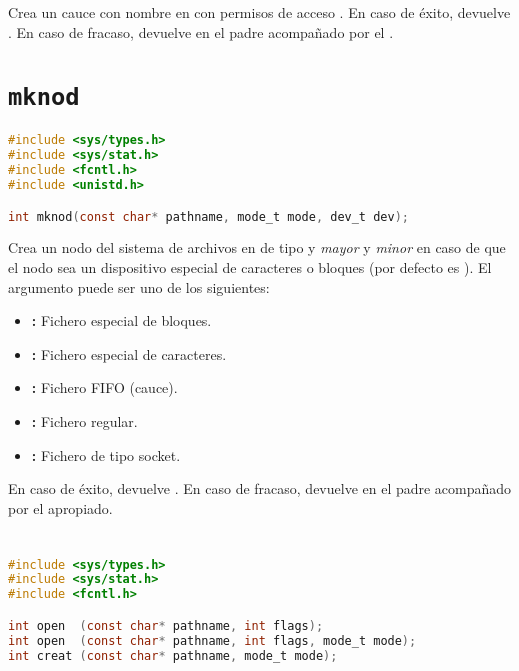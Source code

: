 Crea un cauce con nombre en  con permisos de acceso .
En caso de éxito, devuelve .
En caso de fracaso, devuelve  en el padre acompañado por el .

\section{\texttt{mknod}}\label{mknod}

\begin{lstlisting}[language=C]
#include <sys/types.h>
#include <sys/stat.h>
#include <fcntl.h>
#include <unistd.h>

int mknod(const char* pathname, mode_t mode, dev_t dev);
\end{lstlisting}

Crea un nodo del sistema de archivos en  de tipo  y \emph{mayor} y \emph{minor}  en caso de que el nodo sea un dispositivo especial de caracteres o bloques (por defecto es ).
El argumento  puede ser uno de los siguientes:

\begin{itemize}
	\item{}\textbf{:} Fichero especial de bloques.
	\item{}\textbf{:} Fichero especial de caracteres.
	\item{}\textbf{:} Fichero FIFO (cauce).
	\item{}\textbf{:} Fichero regular.
	\item{}\textbf{:} Fichero de tipo socket.
\end{itemize}

En caso de éxito, devuelve .
En caso de fracaso, devuelve  en el padre acompañado por el  apropiado.

\section{}\label{open}

\begin{lstlisting}[language=C]
#include <sys/types.h>
#include <sys/stat.h>
#include <fcntl.h>

int open  (const char* pathname, int flags);
int open  (const char* pathname, int flags, mode_t mode);
int creat (const char* pathname, mode_t mode);
\end{lstlisting}

